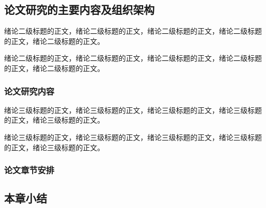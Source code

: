 \subsection{论文研究的主要内容及组织架构}

绪论二级标题的正文，绪论二级标题的正文，绪论二级标题的正文，绪论二级标题的正文，绪论二级标题的正文。

绪论二级标题的正文，绪论二级标题的正文，绪论二级标题的正文，绪论二级标题的正文，绪论二级标题的正文。

\subsubsection{论文研究内容}

绪论三级标题的正文，绪论三级标题的正文，绪论三级标题的正文，绪论三级标题的正文，绪论三级标题的正文。

绪论三级标题的正文，绪论三级标题的正文，绪论三级标题的正文，绪论三级标题的正文，绪论三级标题的正文。

\subsubsection{论文章节安排}


\subsection{本章小结}
